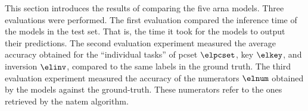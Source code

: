 
This section introduces the results of comparing the five
\gls{arna} models. Three evaluations were performed. The
first evaluation compared the inference time of the models
in the test set. That is, the time it took for the models to
output their predictions. The second evaluation experiment
measured the average accuracy obtained for the ``individual
tasks'' of \gls{pcset} $\elpcset$, key $\elkey$, and
inversion $\elinv$, compared to the same labels in the
ground truth. The third evaluation experiment measured the
accuracy of the numerators $\elnum$ obtained by the models
against the ground-truth. These numerators refer to the ones
retrieved by the \gls{natem} algorithm.

